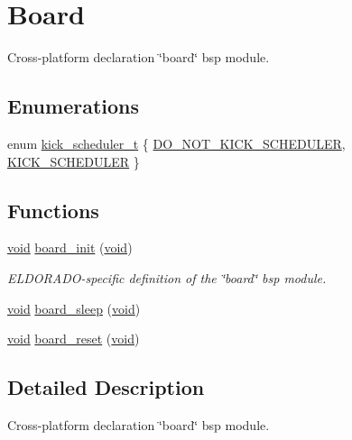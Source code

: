 \hypertarget{group__board}{}\section{Board}
\label{group__board}


Cross-\/platform declaration \char`\"{}board\char`\"{} bsp module.  


\subsection*{Enumerations}
\begin{DoxyCompactItemize}
\item 
enum \hyperlink{group__board_gac9ebdcc0a4f3c8422f5f4f0fbbe0ded0}{kick\+\_\+scheduler\+\_\+t} \{ \hyperlink{group__board_ggac9ebdcc0a4f3c8422f5f4f0fbbe0ded0af6d55ee11038f75d0bab35fde4b8ed4f}{D\+O\+\_\+\+N\+O\+T\+\_\+\+K\+I\+C\+K\+\_\+\+S\+C\+H\+E\+D\+U\+L\+ER}, 
\hyperlink{group__board_ggac9ebdcc0a4f3c8422f5f4f0fbbe0ded0adf96785b5ae3022ffe1e95cc5301f74a}{K\+I\+C\+K\+\_\+\+S\+C\+H\+E\+D\+U\+L\+ER}
 \}
\end{DoxyCompactItemize}
\subsection*{Functions}
\begin{DoxyCompactItemize}
\item 
\hyperlink{usb__devapi_8h_afabf60e7f57651d6d595a02c75f07cd0}{void} \hyperlink{group__board_ga916f2adc2080b4fe88034086d107a8dc}{board\+\_\+init} (\hyperlink{usb__devapi_8h_afabf60e7f57651d6d595a02c75f07cd0}{void})
\begin{DoxyCompactList}\small\item\em E\+L\+D\+O\+R\+A\+D\+O-\/specific definition of the \char`\"{}board\char`\"{} bsp module. \end{DoxyCompactList}\item 
\hyperlink{usb__devapi_8h_afabf60e7f57651d6d595a02c75f07cd0}{void} \hyperlink{group__board_ga052cfe534a52d7f046e311d4adec00a8}{board\+\_\+sleep} (\hyperlink{usb__devapi_8h_afabf60e7f57651d6d595a02c75f07cd0}{void})
\item 
\hyperlink{usb__devapi_8h_afabf60e7f57651d6d595a02c75f07cd0}{void} \hyperlink{group__board_gafbd0c8dccf10506bd3912960c8cba369}{board\+\_\+reset} (\hyperlink{usb__devapi_8h_afabf60e7f57651d6d595a02c75f07cd0}{void})
\end{DoxyCompactItemize}


\subsection{Detailed Description}
Cross-\/platform declaration \char`\"{}board\char`\"{} bsp module. 

